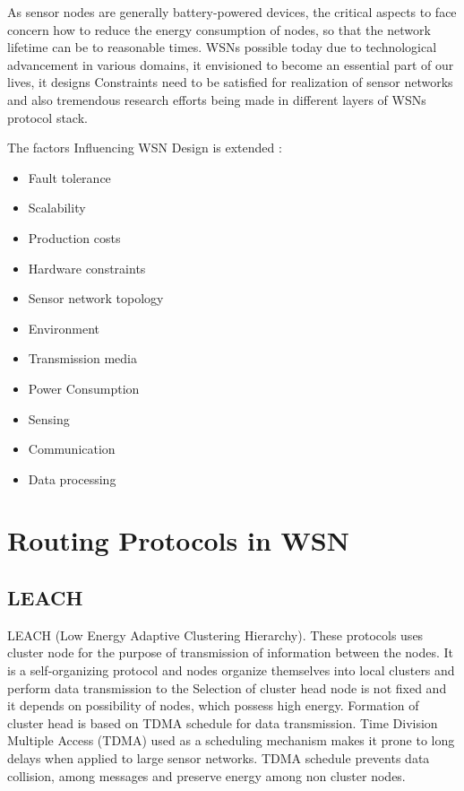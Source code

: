 \documentclass[journal,transmag]{IEEEtran}
\begin{document}
As sensor nodes are generally battery-powered devices, the critical aspects to face concern how to reduce the energy consumption of nodes, so that the network lifetime can be to reasonable times. WSNs possible today due to technological advancement in various domains, it envisioned to become an essential part of our lives, it designs Constraints need to be satisfied for realization of sensor networks and also tremendous research efforts being made in different layers of WSNs protocol stack.

The factors Influencing WSN Design is extended :

\begin{itemize}
  \item Fault tolerance
  \item Scalability
  \item Production costs
  \item Hardware constraints
  \item Sensor network topology
  \item Environment
  \item Transmission media
  \item Power Consumption
  \item Sensing
  \item Communication
  \item Data processing
\end{itemize}

\section{Routing Protocols in WSN}

\subsection{LEACH}

LEACH (Low Energy Adaptive Clustering Hierarchy). These protocols uses cluster node for the purpose of transmission of information between the nodes. It is a self-organizing protocol and nodes organize themselves into local clusters and perform data transmission to the Selection of cluster head node is not fixed and it depends on possibility of nodes, which possess high energy. Formation of cluster head is based on TDMA schedule for data transmission. Time Division Multiple Access (TDMA) used as a scheduling mechanism makes it prone to long delays when applied to large sensor networks. TDMA schedule prevents data collision, among messages and preserve energy among non cluster nodes.
\end{document}
